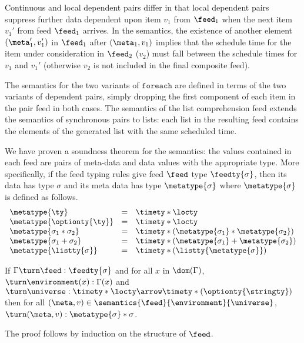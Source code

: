 Continuous and local dependent pairs differ in that local dependent
pairs suppress further data dependent upon item $v_1$ from $\feed_1$
when the next item $v_1'$ from feed $\feed_1$ arrives.  In the
semantics, the existence of another element $(\meta_1',v_1')$
in $\feed_1$ after $(\meta_1,v_1)$ implies that the 
schedule time for the item under consideration in $\feed_2$ ($v_2$) 
must fall between the schedule times for $v_1$ and $v_1'$
(otherwise $v_2$ is not included in the final composite feed). 

The semantics for the two variants of $\mathtt{foreach}$ are defined
in terms of the two variants of dependent pairs, simply dropping the
first component of each item in the pair feed in both cases.  The semantics
of the list comprehension feed extends the semantics of synchronous
pairs to lists: each list in the resulting feed contains the elements
of the generated list with the same scheduled time.

We have proven a soundness theorem for the semantics: the values
contained in each feed are pairs of meta-data and data 
values with the appropriate type.  More specifically, if the feed typing
rules give feed $\feed$ type $\feedty{\sigma}$, 
then its data has type $\sigma$ and
its meta data has type $\metatype{\sigma}$ where $\metatype{\sigma}$ is
defined as follows.
\[
\begin {array} {lcl}
\metatype{\ty} & = & \timety * \locty \\
\metatype{\optionty{\ty}} & = & \timety * \locty \\
\metatype{\sigma_1 * \sigma_2} & = & \timety * (\metatype{\sigma_1} * \metatype{\sigma_2}) \\
\metatype{\sigma_1 + \sigma_2} & = & \timety * (\metatype{\sigma_1} + \metatype{\sigma_2}) \\
\metatype{\listty{\sigma}} & = & \timety * (\listty{\metatype{\sigma}}) \\
\end{array}
\]
\begin{theorem}
If $\Gamma \turn \feed : \feedty{\sigma}$ and
for all $x$ in $\dom(\Gamma)$, $\turn \environment(x) : \Gamma(x)$
and $\turn \universe : \timety * \locty \arrow \timety * (\optionty{\stringty})$
then
for all $(\meta,v) \in \semantics{\feed}{\environment}{\universe}$,
$\turn (\meta,v) : \metatype{\sigma} * \sigma$. 
\end{theorem}
The proof follows by induction on the structure of $\feed$.




